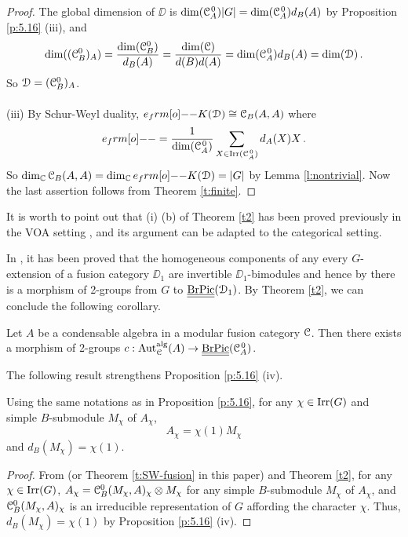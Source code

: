 \documentclass{amsart}
\begin{document}
\begin{proof}
 The global dimension of $\DD$ is $\dim({{\EuScript{C}}_A^{\hspace{1pt}0}})|G| =\dim({{\EuScript{C}}_A^{\hspace{1pt}0}})d_B(A)$ by Proposition \ref{p:5.16} (iii), and
$$
\dim(({{\EuScript{C}}_B^0})_A) = \frac{\dim({{\EuScript{C}}_B^0})}{d_B(A)}=\frac{\dim({\EuScript{C}})}{d(B) d(A)} = \dim({{\EuScript{C}}_A^{\hspace{1pt}0}}) d_B(A) =\dim({\EuScript{D}})\,.
$$
So ${\EuScript{D}} = ({{\EuScript{C}}_B^0})_A$. \\ \\
(iii) By Schur-Weyl duality, $e_\1 K(\DD)\cong \CB(A,A)$ where 
$$
e_\1=\frac{1}{\dim(\CAo)}\sum_{X \in \iCAo} d_A(X) X\,.
$$
So $\dim_{\BC} \CB(A,A) = \dim_\BC e_\1 K(\DD) = |G|$ by Lemma \ref{l:nontrivial}. Now the last assertion follows from Theorem \ref{t:finite}.
\end{proof}

It is worth to point out  that (i) (b) of Theorem \ref{t2} has been proved previously in the VOA setting  \cite{McRae2021}, and its argument can be adapted to the categorical setting. 

In \cite[Thm. 6.1]{ENO2010}, it has been proved  that the homogeneous components of any every $G$-extension of a fusion category $\DD_1$ are invertible $\DD_1$-bimodules and hence by \cite[Thm. 7.7]{ENO2010} there is a morphism of 2-groups from $G$ to $\underline{\underline{\rm BrPic}}({\EuScript{D}}_1)$. By  Theorem \ref{t2}, we can conclude  the following corollary.
\begin{cor} \label{c:Pic1}
    Let $A$ be a condensable algebra in a modular fusion category ${\EuScript{C}}$. Then there exists a morphism of 2-groups $c: {\operatorname{Aut}_{\EuScript{C}}^{\operatorname{alg}}}(A) \to \underline{\underline{\rm BrPic}}({{\EuScript{C}}_A^{\hspace{1pt}0}})$. \qedhere
\end{cor}




The following result strengthens Proposition \ref{p:5.16} (iv). 

\begin{cor} \label{c:degree} Using the same notations as in Proposition \ref{p:5.16}, for any $\chi\in \operatorname{Irr}(G)$ and simple $B$-submodule $M_\chi$ of $A_\chi$,
$$
A_{\chi}=\chi(1)M_\chi 
$$
and $d_B(M_\chi)=\chi(1)$.
\end{cor}
\begin{proof} From  \cite[Theorem I]{DNRX2025} (or Theorem \ref{t:SW-fusion} in this paper) and Theorem \ref{t2}, for any $\chi \in\operatorname{Irr}(G)$,
$A_{\chi}={{\EuScript{C}}_B^0}(M_\chi,A)_\chi\otimes M_{\chi}$ for any simple $B$-submodule $M_\chi$ of $A_\chi$, and ${{\EuScript{C}}_B^0}(M_\chi,A)_\chi$ is an irreducible representation of $G$ affording the character $\chi$. Thus, $d_B(M_\chi) =\chi(1)$ by Proposition \ref{p:5.16} (iv).
\end{proof}
\end{document}
